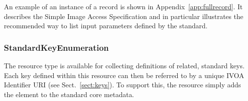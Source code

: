 \documentclass[11pt,a4paper]{ivoa}
\begin{document}
An example of an instance of a 
record is shown in Appendix~\ref{app:fullrecord}.  It describes the
Simple Image Access Specification and
in particular illustrates the recommended way to list input parameters
defined by the standard.  



\subsubsection{StandardKeyEnumeration}

The  resource type is available
for collecting definitions of related, standard keys.  Each key defined
within this resource can then be referred to by a unique IVOA
Identifier URI (see Sect.~\ref{sect:keys}).  To support
this, the  resource simply
adds the  element to the standard core
metadata.  
\end{document}
